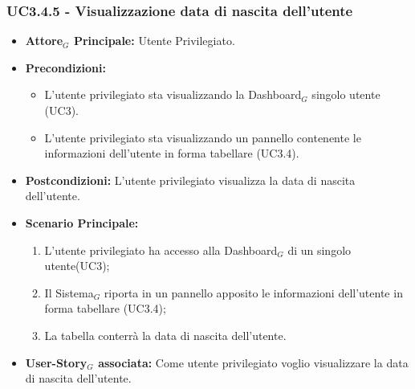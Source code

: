 \documentclass[10pt]{article}
\begin{document}
\begin{justify}
\subsubsection{\textbf{UC3.4.5 - Visualizzazione data di nascita dell'utente}}
\label{UC3.4.5}
\begin{itemize}
     \item \textbf{Attore$_G$ Principale:} Utente Privilegiato.
     \item \textbf{Precondizioni:}
        \begin{itemize}
    	\item L'utente privilegiato sta visualizzando la Dashboard$_G$ singolo utente (UC3).
          \item L'utente privilegiato sta visualizzando un pannello contenente le informazioni dell'utente in forma tabellare (UC3.4).
        \end{itemize}
      \item \textbf{Postcondizioni:} L'utente privilegiato visualizza la data di nascita dell'utente. 
      \item \textbf{Scenario Principale:}
        \begin{enumerate}
            \item L'utente privilegiato ha accesso alla Dashboard$_G$ di un singolo utente(UC3);
            \item Il Sistema$_G$ riporta  in un pannello apposito le informazioni dell'utente in forma tabellare (UC3.4);
            \item La tabella conterrà la data di nascita dell'utente.
        \end{enumerate}
     \item \textbf{User-Story$_G$ associata:}
       Come utente privilegiato voglio visualizzare la data di nascita dell'utente.
\end{itemize}


\end{justify}
\end{document}
